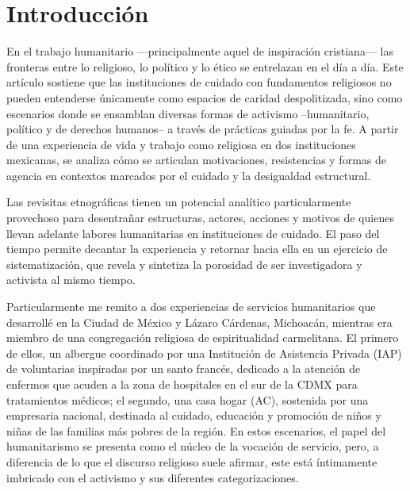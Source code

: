 \documentclass[
  spanish,
  11pt,
  a4paper,
]{scrbook}
\begin{document}
\section*{Introducción}\label{introducciuxf3n-6}


En el trabajo humanitario ---principalmente aquel de inspiración
cristiana--- las fronteras entre lo religioso, lo político y lo ético se
entrelazan en el día a día. Este artículo sostiene que las instituciones
de cuidado con fundamentos religiosos no pueden entenderse únicamente
como espacios de caridad despolitizada, sino como escenarios donde se
ensamblan diversas formas de activismo --humanitario, político y de
derechos humanos-- a través de prácticas guiadas por la fe. A partir de
una experiencia de vida y trabajo como religiosa en dos instituciones
mexicanas, se analiza cómo se articulan motivaciones, resistencias y
formas de agencia en contextos marcados por el cuidado y la desigualdad
estructural.

Las revisitas etnográficas tienen un potencial analítico particularmente
provechoso para desentrañar estructuras, actores, acciones y motivos de
quienes llevan adelante labores humanitarias en instituciones de
cuidado. El paso del tiempo permite decantar la experiencia y retornar
hacia ella en un ejercicio de sistematización, que revela y sintetiza la
porosidad de ser investigadora y activista al mismo tiempo.

Particularmente me remito a dos experiencias de servicios humanitarios
que desarrollé en la Ciudad de México y Lázaro Cárdenas, Michoacán,
mientras era miembro de una congregación religiosa de espiritualidad
carmelitana. El primero de ellos, un albergue coordinado por una
Institución de Asistencia Privada (IAP) de voluntarias inspiradas por un
santo francés, dedicado a la atención de enfermos que acuden a la zona
de hospitales en el sur de la CDMX para tratamientos médicos; el
segundo, una casa hogar (AC), sostenida por una empresaria nacional,
destinada al cuidado, educación y promoción de niños y niñas de las
familias más pobres de la región. En estos escenarios, el papel del
humanitarismo se presenta como el núcleo de la vocación de servicio,
pero, a diferencia de lo que el discurso religioso suele afirmar, este
está íntimamente imbricado con el activismo y sus diferentes
categorizaciones.
\end{document}
